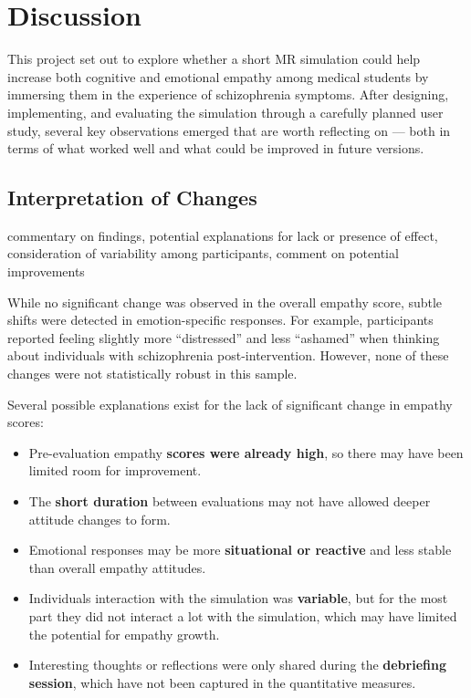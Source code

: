 \chapter{Discussion}
\label{ch:discussion}

This project set out to explore whether a short MR simulation could help increase both cognitive and emotional empathy among medical students by immersing them in the experience of schizophrenia symptoms. After designing, implementing, and evaluating the simulation through a carefully planned user study, several key observations emerged that are worth reflecting on — both in terms of what worked well and what could be improved in future versions.

\section{Interpretation of Changes}

commentary on findings, potential explanations for lack or presence of effect, consideration of variability among participants, comment on potential improvements


While no significant change was observed in the overall empathy score, subtle shifts were detected in emotion-specific responses. For example, participants reported feeling slightly more “distressed” and less “ashamed” when thinking about individuals with schizophrenia post-intervention. However, none of these changes were not statistically robust in this sample.

Several possible explanations exist for the lack of significant change in empathy scores:
\begin{itemize}
  \item Pre-evaluation empathy \textbf{scores were already high}, so there may have been limited room for improvement.
  \item The \textbf{short duration} between evaluations may not have allowed deeper attitude changes to form.
  \item Emotional responses may be more \textbf{situational or reactive} and less stable than overall empathy attitudes.
  \item Individuals interaction with the simulation was \textbf{variable}, but for the most part they did not interact a lot with the simulation, which may have limited the potential for empathy growth.
  \item Interesting thoughts or reflections were only shared during the \textbf{debriefing session}, which have not been captured in the quantitative measures.
\end{itemize}

